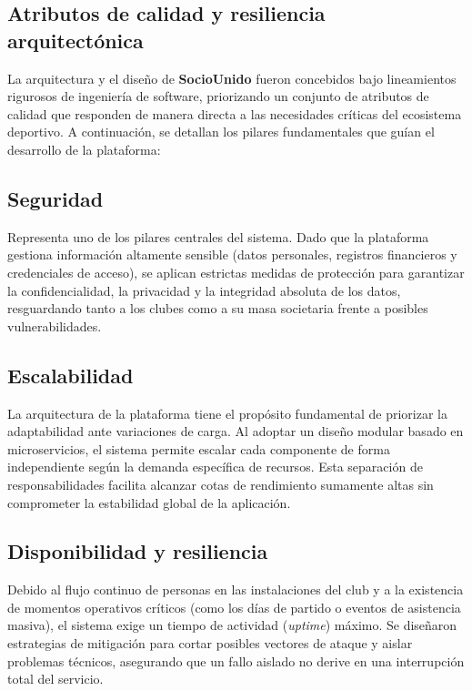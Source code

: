 \subsection{Atributos de calidad y resiliencia arquitectónica}

La arquitectura y el diseño de \textbf{SocioUnido} fueron concebidos bajo lineamientos rigurosos de ingeniería de software, priorizando un conjunto de atributos de calidad que responden de manera directa a las necesidades críticas del ecosistema deportivo. A continuación, se detallan los pilares fundamentales que guían el desarrollo de la plataforma:

\subsection{Seguridad}

Representa uno de los pilares centrales del sistema. Dado que la plataforma gestiona información altamente sensible (datos personales, registros financieros y credenciales de acceso), se aplican estrictas medidas de protección para garantizar la confidencialidad, la privacidad y la integridad absoluta de los datos, resguardando tanto a los clubes como a su masa societaria frente a posibles vulnerabilidades.

\newpage

\subsection{Escalabilidad}

La arquitectura de la plataforma tiene el propósito fundamental de priorizar la adaptabilidad ante variaciones de carga. Al adoptar un diseño modular basado en microservicios, el sistema permite escalar cada componente de forma independiente según la demanda específica de recursos. Esta separación de responsabilidades facilita alcanzar cotas de rendimiento sumamente altas sin comprometer la estabilidad global de la aplicación.

\subsection{Disponibilidad y resiliencia}

Debido al flujo continuo de personas en las instalaciones del club y a la existencia de momentos operativos críticos (como los días de partido o eventos de asistencia masiva), el sistema exige un tiempo de actividad (\textit{uptime}) máximo. Se diseñaron estrategias de mitigación para cortar posibles vectores de ataque y aislar problemas técnicos, asegurando que un fallo aislado no derive en una interrupción total del servicio.

